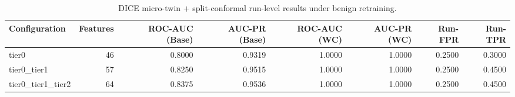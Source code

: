 \begin{table}[t]
\centering
\caption{DICE micro-twin + split-conformal run-level results under benign retraining.}
\label{tab:dice_full_overall}
\footnotesize
\begin{tabular}{lrrrrrrr}
\toprule
Configuration & Features & ROC-AUC (Base) & AUC-PR (Base) & ROC-AUC (WC) & AUC-PR (WC) & Run-FPR & Run-TPR \\
\midrule
tier0 & 46 & 0.8000 & 0.9319 & 1.0000 & 1.0000 & 0.2500 & 0.3000 \\
tier0_tier1 & 57 & 0.8250 & 0.9515 & 1.0000 & 1.0000 & 0.2500 & 0.4500 \\
tier0_tier1_tier2 & 64 & 0.8375 & 0.9536 & 1.0000 & 1.0000 & 0.2500 & 0.4500 \\
\bottomrule
\end{tabular}

\end{table}
